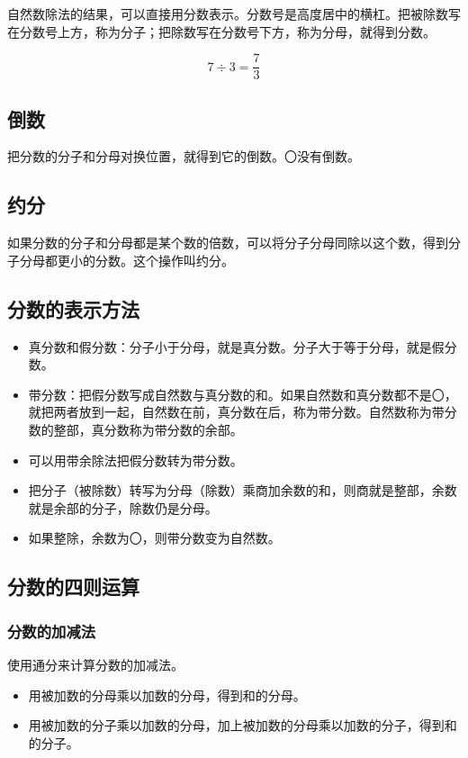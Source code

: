 \documentclass[12pt,UTF8]{ctexbook}
\begin{document}
自然数除法的结果，可以直接用分数表示。分数号是高度居中的横杠。把被除数写在分数号上方，称为分子；把除数写在分数号下方，称为分母，就得到分数。

\[ 7 \div 3 = \frac{7}{3}\]

\subsection{倒数}

把分数的分子和分母对换位置，就得到它的倒数。〇没有倒数。

\subsection{约分}

如果分数的分子和分母都是某个数的倍数，可以将分子分母同除以这个数，得到分子分母都更小的分数。这个操作叫约分。

\subsection{分数的表示方法}

\begin{itemize}
\item 真分数和假分数：分子小于分母，就是真分数。分子大于等于分母，就是假分数。
\item 带分数：把假分数写成自然数与真分数的和。如果自然数和真分数都不是〇，就把两者放到一起，自然数在前，真分数在后，称为带分数。自然数称为带分数的整部，真分数称为带分数的余部。
\item 可以用带余除法把假分数转为带分数。
\item 把分子（被除数）转写为分母（除数）乘商加余数的和，则商就是整部，余数就是余部的分子，除数仍是分母。
\item 如果整除，余数为〇，则带分数变为自然数。
\end{itemize}

\subsection{分数的四则运算}

\subsubsection{分数的加减法}

使用通分来计算分数的加减法。

\begin{itemize}
\item 用被加数的分母乘以加数的分母，得到和的分母。
\item 用被加数的分子乘以加数的分母，加上被加数的分母乘以加数的分子，得到和的分子。
\end{itemize}
\end{document}
